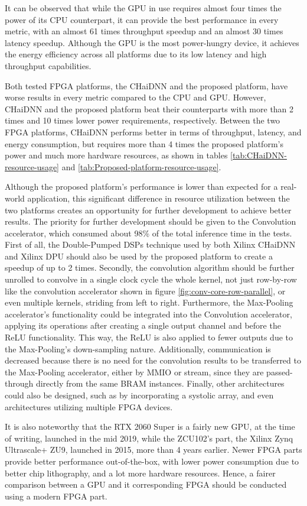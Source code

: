 It can be observed that while the GPU in use requires almost four times the power of its CPU counterpart, it can provide the best performance in every metric, with an almost 61 times throughput speedup and an almost 30 times latency speedup. Although the GPU is the most power-hungry device, it achieves the energy efficiency across all platforms due to its low latency and high throughput capabilities.

Both tested FPGA platforms, the CHaiDNN and the proposed platform, have worse results in every metric compared to the CPU and GPU. However, CHaiDNN and the proposed platform beat their counterparts with more than 2 times and 10 times lower power requirements, respectively. Between the two FPGA platforms, CHaiDNN performs better in terms of throughput, latency, and energy consumption, but requires more than 4 times the proposed platform's power and much more hardware resources, as shown in tables \ref{tab:CHaiDNN-resource-usage} and \ref{tab:Proposed-platform-resource-usage}.

Although the proposed platform's performance is lower than expected for a real-world application, this significant difference in resource utilization between the two platforms creates an opportunity for further development to achieve better results. The priority for further development should be given to the Convolution accelerator, which consumed about 98\% of the total inference time in the tests. First of all, the Double-Pumped DSPs technique used by both Xilinx CHaiDNN and Xilinx DPU should also be used by the proposed platform to create a speedup of up to 2 times. Secondly, the convolution algorithm should be further unrolled to convolve in a single clock cycle the whole kernel, not just row-by-row like the convolution accelerator shown in figure \ref{fig:conv-core-row-parallel}, or even multiple kernels, striding from left to right. Furthermore, the Max-Pooling accelerator's functionality could be integrated into the Convolution accelerator, applying its operations after creating a single output channel and before the ReLU functionality. This way, the ReLU is also applied to fewer outputs due to the Max-Pooling's down-sampling nature. Additionally, communication is decreased because there is no need for the convolution results to be transferred to the Max-Pooling accelerator, either by MMIO or stream, since they are passed-through directly from the same BRAM instances. Finally, other architectures could also be designed, such as by incorporating a systolic array, and even architectures utilizing multiple FPGA devices.

It is also noteworthy that the RTX 2060 Super is a fairly new GPU, at the time of writing, launched in the mid 2019, while the ZCU102's part, the Xilinx Zynq Ultrascale+ ZU9, launched in 2015, more than 4 years earlier. Newer FPGA parts provide better performance out-of-the-box, with lower power consumption due to better chip lithography, and a lot more hardware resources. Hence, a fairer comparison between a GPU and it corresponding FPGA should be conducted using a modern FPGA part.
